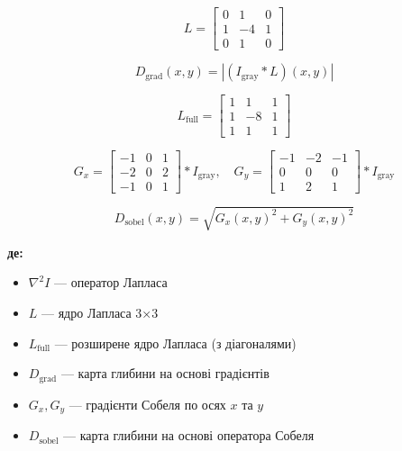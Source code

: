 \documentclass[14pt, a4paper]{extarticle}
\numberwithin{equation}{section}
\begin{document}
\begin{equation}
L = \begin{bmatrix}
0 & 1 & 0 \\
1 & -4 & 1 \\
0 & 1 & 0
\end{bmatrix} \tag{28}
\end{equation}

\begin{equation}
\boxed{D_{\text{grad}}(x,y) = |(I_{\text{gray}} * L)(x,y)|} \tag{29}
\end{equation}

\begin{equation}
L_{\text{full}} = \begin{bmatrix}
1 & 1 & 1 \\
1 & -8 & 1 \\
1 & 1 & 1
\end{bmatrix} \tag{30}
\end{equation}

\begin{equation}
G_x = \begin{bmatrix}
-1 & 0 & 1 \\
-2 & 0 & 2 \\
-1 & 0 & 1
\end{bmatrix} * I_{\text{gray}}, \quad
G_y = \begin{bmatrix}
-1 & -2 & -1 \\
0 & 0 & 0 \\
1 & 2 & 1
\end{bmatrix} * I_{\text{gray}} \tag{31}
\end{equation}

\begin{equation}
\boxed{D_{\text{sobel}}(x,y) = \sqrt{G_x(x,y)^2 + G_y(x,y)^2}} \tag{32}
\end{equation}

\textbf{де:}
\begin{itemize}
\item $\nabla^2 I$ — оператор Лапласа
\item $L$ — ядро Лапласа 3×3
\item $L_{\text{full}}$ — розширене ядро Лапласа (з діагоналями)
\item $D_{\text{grad}}$ — карта глибини на основі градієнтів
\item $G_x, G_y$ — градієнти Собеля по осях $x$ та $y$
\item $D_{\text{sobel}}$ — карта глибини на основі оператора Собеля
\end{itemize}
\end{document}
